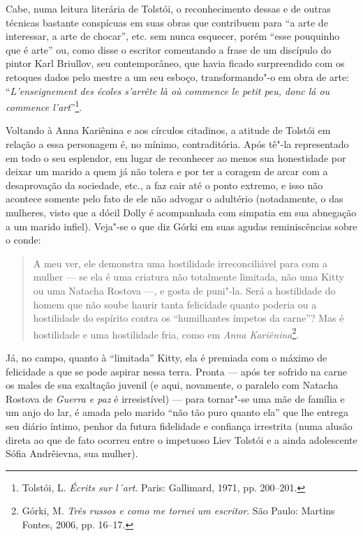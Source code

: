 Cabe, numa leitura literária de Tolstói, o reconhecimento dessas e de
outras técnicas bastante conspícuas em suas obras que contribuem para
``a arte de interessar, a arte de chocar'', etc. sem nunca esquecer,
porém ``esse pouquinho que é arte'' ou, como disse o escritor
comentando a frase de um discípulo do pintor Karl Briullov, seu
contemporâneo, que havia ficado surpreendido com os retoques dados pelo
mestre a um seu esboço, transformando"-o em obra de arte:
``\emph{L'enseignement des écoles s'arrête là où commence \emph{le petit
peu}, donc lá ou commence l'art}''\footnote{Tolstói, L. \emph{Écrits sur l´art}. Paris: Gallimard, 1971, pp.
200--201.}.

Voltando à Anna Kariênina e aos círculos citadinos, a atitude de
Tolstói em relação a essa personagem é, no mínimo, contraditória. Após
tê"-la representado em todo o seu esplendor, em lugar de reconhecer ao
menos sua honestidade por deixar um marido a quem já não tolera e
por ter a coragem de arcar com a desaprovação da sociedade, etc., a faz
cair até o ponto extremo, e isso não acontece somente pelo fato de ele
não advogar o adultério (notadamente, o das mulheres, visto que a dócil
Dolly é acompanhada com simpatia em sua abnegação a um marido infiel).
Veja"-se o que diz Górki em suas agudas reminiscências sobre o conde:

\begin{quote}
A meu ver, ele demonstra uma hostilidade irreconciliável para com a
mulher --- se ela é uma criatura não totalmente limitada, não uma Kitty
ou uma Natacha Rostova ---, e gosta de puni"-la. Será a hostilidade do
homem que não soube haurir tanta felicidade quanto poderia ou a
hostilidade do espírito contra os ``humilhantes ímpetos da carne''? Mas é
hostilidade e uma hostilidade fria, como em \emph{Anna Kariênina}\footnote{Górki, M. \emph{Três russos e como me tornei um escritor}. São Paulo: Martins Fontes, 2006, pp. 16--17.}.
\end{quote}

Já, no campo, quanto à ``limitada'' Kitty, ela é premiada com o
máximo de felicidade a que se pode aspirar nessa terra. Pronta ---
após ter sofrido na carne os males de sua exaltação juvenil (e aqui,
novamente, o paralelo com Natacha Rostova de \emph{Guerra e paz} é
irresistível) --- para tornar"-se uma mãe de família e um anjo do lar, é
amada pelo marido ``não tão puro quanto ela'' que lhe entrega seu diário
íntimo, penhor da futura fidelidade e confiança irrestrita (numa alusão
direta ao que de fato ocorreu entre o impetuoso Liev Tolstói e a ainda
adolescente Sófia Andrêievna, sua mulher).

